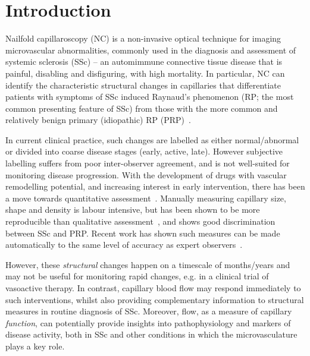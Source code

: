 \documentclass[runningheads,a4paper]{llncs}
\def\eg{e.g.}
\begin{document}
\section{Introduction}
\label{s:introduction}
Nailfold capillaroscopy (NC) is a non-invasive optical technique for imaging microvascular abnormalities, commonly used in the diagnosis and assessment of systemic sclerosis (SSc) -- an automimmune connective tissue disease that is painful, disabling and disfiguring, with high mortality. In particular, NC can identify the characteristic structural changes in capillaries that differentiate patients with symptoms of SSc induced Raynaud’s phenomenon (RP; the most common presenting feature of SSc) from those with the more common and relatively benign primary (idiopathic) RP (PRP)~\cite{HerrickCOinR2011,Cutolo_etal_BPRCR08}.

In current clinical practice, such changes are labelled as either normal/abnormal or divided into coarse disease stages (early, active, late). However subjective labelling suffers from poor inter-observer agreement, and is not well-suited for monitoring disease progression. With the development of drugs with vascular remodelling potential, and increasing interest in early intervention, there has been a move towards quantitative assessment~\cite{Murray_etal_AR09,Berks_MICCAI14}. Manually measuring capillary size, shape and density is labour intensive, but has been shown to be more reproducible than qualitative assessment~\cite{Murray_etal_AR09}, and shows good discrimination between SSc and PRP. Recent work has shown such measures can be made automatically to the same level of accuracy as expert observers~\cite{Berks_MICCAI14}.

However, these \textit{structural} changes happen on a timescale of months/years and may not be useful for monitoring rapid changes, e.g. in a clinical trial of vasoactive therapy. In contrast, capillary blood flow may respond immediately to such interventions, whilst also providing complementary information to structural measures in routine diagnosis of SSc. Moreover, flow, as a measure of capillary \textit{function}, can potentially provide insights into pathophysiology and markers of disease activity, both in SSc and other conditions in which the microvasculature plays a key role.%
\end{document}
